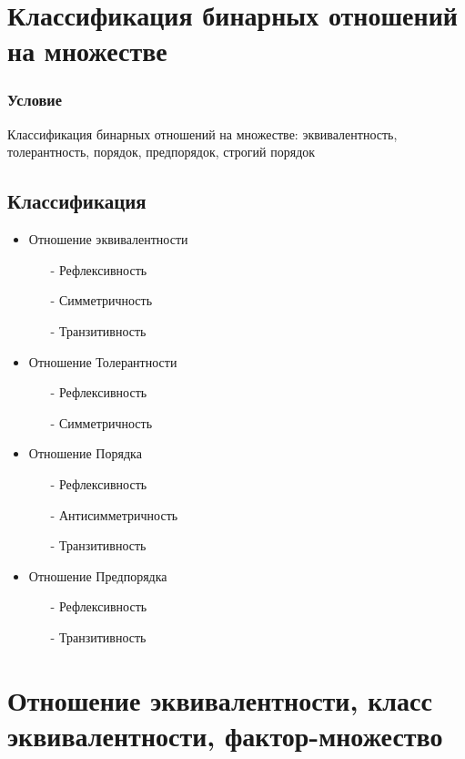 \documentclass{report}
\begin{document}
\section{Классификация бинарных отношений на множестве}
\subsubsection{Условие}
Классификация бинарных отношений на множестве: эквивалентность, толерантность,
порядок, предпорядок, строгий порядок
\subsection{Классификация}
\begin{itemize}
	\item Отношение эквивалентности
	      \begin{itemize}
		      \item[-] Рефлексивность
		      \item[-] Симметричность
		      \item[-] Транзитивность
	      \end{itemize}
	\item Отношение Толерантности
	      \begin{itemize}
		      \item[-] Рефлексивность
		      \item[-] Симметричность
	      \end{itemize}
	\item Отношение Порядка
	      \begin{itemize}
		      \item[-] Рефлексивность
		      \item[-] Антисимметричность
		      \item[-] Транзитивность
	      \end{itemize}
	\item Отношение Предпорядка
	      \begin{itemize}
		      \item[-] Рефлексивность
		      \item[-] Транзитивность
	      \end{itemize}
\end{itemize}

\newpage

\section{Отношение эквивалентности, класс эквивалентности, фактор-множество}
\end{document}
